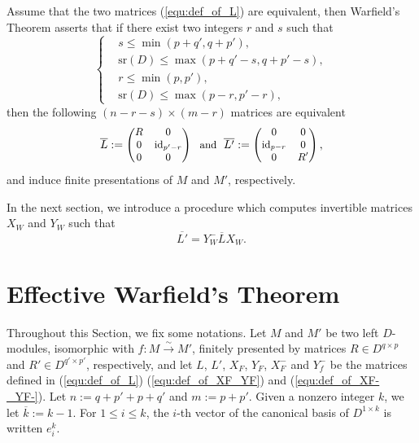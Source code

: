 \documentclass{ifacconf}
\newcommand\id[1]{\text{id}_{#1}}
\newcommand\sr{\text{sr}(D)}
\begin{document}
Assume that the two matrices (\ref{equ:def_of_L}) are equivalent, then
Warfield's Theorem asserts that if there exist two integers $r$ and $s$
such that
\medskip
\begin{equation}\label{equ:s_r}
  \left\{
  \begin{split}
    & s\leq\min(p+q',q+p'),\\
    & \sr\leq\max(p+q'-s,q+p'-s),\\
    &r\leq\min(p,p'), \\
    & \sr\leq\max(p-r, p'-r),
  \end{split}
  \right.
\end{equation}
\medskip
then the following $(n-r-s)\times (m-r)$ matrices are equivalent
\medskip
\begin{equation}\label{equ:def_of_L_bar}
  \begin{small}
    \overline{L}:=\begin{pmatrix}
    R & 0 \\
    0 & \id{p'-r} \\
    0 & 0
    \end{pmatrix}\ \ \text{and}\ \
    \overline{L'}:=\begin{pmatrix}
    0 & 0 \\
    \id{p-r} & 0 \\
    0 & R'
    \end{pmatrix},
  \end{small}
\end{equation}
\medskip
and induce finite presentations of $M$ and $M'$, respectively.

In the next section, we introduce a procedure which computes invertible
matrices $X_W$ and $Y_W$ such that
\medskip
\[\overline{L'}=Y_W^-\overline{L}X_W.\]

\section{Effective Warfield's Theorem}

Throughout this Section, we fix some notations. Let $M$ and $M'$ be two
left $D$-modules, isomorphic with $f:M\overset{\sim}{\to}M'$, finitely
presented by matrices $R\in D^{q\times p}$ and $R'\in D^{q'\times p'}$,
respectively, and let $L$, $L'$, $X_F$, $Y_F$, $X_F^-$ and $Y_f^-$ be the
matrices defined in (\ref{equ:def_of_L}) (\ref{equ:def_of_XF_YF}) and
(\ref{equ:def_of_XF-_YF-}). Let $n:=q+p'+p+q'$ and $m:=p+p'$. Given a
nonzero integer $k$, we let $\overline{k}:=k-1$. For $1\leq i\leq k$, the
$i$-th vector of the canonical basis of $D^{1\times k}$ is written $e_i^k$. 
\end{document}
